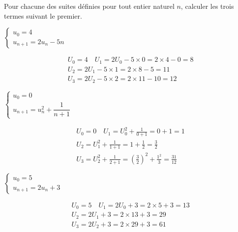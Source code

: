 \documentclass[12pt,a4paper]{article}  %
\begin{document}
Pour chacune des suites définies pour tout entier naturel $n$, calculer les trois termes suivant le premier.
	\begin{enumMet}
		\item $\left\{\begin{array}{l}u_0=4 \\ u_{n+1}=2 u_n-5 n\end{array}\right.$
		\begin{corrBox}
			$$
			\begin{aligned}
				& U_0=4 \quad U_1=2 U_0-5 \times 0=2 \times 4-0=8 \\
				& U_2=2 U_1-5 \times 1=2 \times 8-5=11 \\
				& U_3=2 U_2-5 \times 2=2 \times 11-10=12
			\end{aligned}
			$$
		\end{corrBox}
		\item $\left\{\begin{array}{l}u_0=0 \\ u_{n+1}=u_n^2+\dfrac{1}{ n+1}\end{array}\right.$
		\begin{corrBox}
			$$
			\begin{aligned}
				& U_0=0 \quad U_1=U_0^2+\frac{1}{0+1}=0+1=1 \\
				& U_2=U_1^2+\frac{1}{1+1}=1+\frac{1}{2}=\frac{3}{2} \\
				& U_3=U_2^2+\frac{1}{2+1}=\left(\frac{3}{2}\right)^2+\frac{1^2}{3}=\frac{31}{12}
			\end{aligned}
			$$
		\end{corrBox}
		\item {} $\left\{\begin{array}{l}u_0=5 \\ u_{n+1}=2 u_{n}+3\end{array}\right.$
		\begin{corrBox}
			$$
			\begin{aligned}
				& U_0=5 \quad U_1=2 U_0+3=2 \times 5+3=13 \\
				& U_2=2 U_1+3=2 \times 13+3=29 \\
				& U_3=2 U_2+3=2 \times 29+3=61
			\end{aligned}
			$$
		\end{corrBox}
	\end{enumMet}

\end{document}
